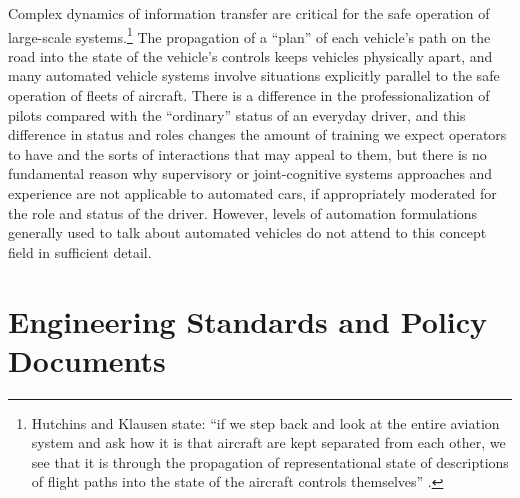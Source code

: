 
Complex dynamics of information transfer are critical
for the safe operation of large-scale systems.\footnote{Hutchins and
  Klausen state: ``if we step back and 
look at the entire aviation system and ask how
it is that aircraft are kept separated from each other, we see that it
is through the propagation of representational state of descriptions
of flight paths into the state of the aircraft controls
themselves'' \cite[p. 14]{hutchinsKlausen}.} The propagation of a ``plan'' of each
vehicle's path on the 
road into the state of the vehicle's controls keeps vehicles
physically apart, and many automated vehicle systems involve
situations explicitly parallel to the safe operation of fleets of
aircraft. There is a difference in the 
professionalization of pilots compared with the ``ordinary'' status of an
everyday driver, and this difference in status and roles
changes the amount of training we expect operators to have and the
sorts of interactions that may appeal to them, but there is no
fundamental reason why supervisory or joint-cognitive
systems approaches and
experience are not applicable to automated cars, if appropriately
moderated for the role and status of the driver. However, levels of
automation formulations generally used to 
talk about automated vehicles do not attend to this concept field in
sufficient detail.


\section{Engineering Standards and Policy Documents}




